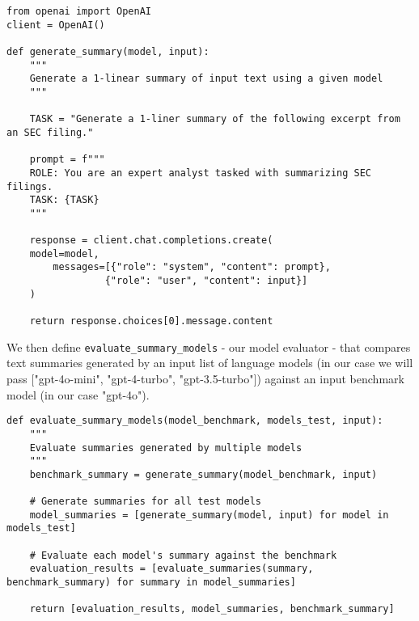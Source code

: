 \begin{verbatim}
from openai import OpenAI
client = OpenAI()

def generate_summary(model, input):
    """
    Generate a 1-linear summary of input text using a given model
    """
    
    TASK = "Generate a 1-liner summary of the following excerpt from an SEC filing."

    prompt = f"""
    ROLE: You are an expert analyst tasked with summarizing SEC filings.
    TASK: {TASK}
    """
    
    response = client.chat.completions.create(
    model=model,
        messages=[{"role": "system", "content": prompt},
                 {"role": "user", "content": input}]
    )
    
    return response.choices[0].message.content
\end{verbatim}
We then define \texttt{evaluate\_summary\_models} - our model evaluator - that compares text summaries generated by an input list of language models (in our case we will pass $[$"gpt-4o-mini", "gpt-4-turbo", "gpt-3.5-turbo"$]$) against an input benchmark model (in our case "gpt-4o").~
\begin{verbatim}
def evaluate_summary_models(model_benchmark, models_test, input):
    """
    Evaluate summaries generated by multiple models
    """
    benchmark_summary = generate_summary(model_benchmark, input)

    # Generate summaries for all test models
    model_summaries = [generate_summary(model, input) for model in models_test]
    
    # Evaluate each model's summary against the benchmark
    evaluation_results = [evaluate_summaries(summary, benchmark_summary) for summary in model_summaries]

    return [evaluation_results, model_summaries, benchmark_summary]
\end{verbatim}

